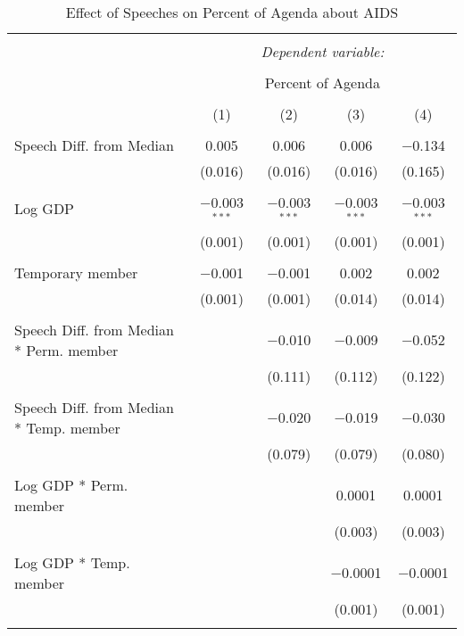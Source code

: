 
\begin{table}[!htbp] \centering 
  \caption{Effect of Speeches on Percent of Agenda about  AIDS} 
  \label{} 
\begin{tabular}{@{\extracolsep{5pt}}lcccc} 
\\[-1.8ex]\hline 
\hline \\[-1.8ex] 
 & \multicolumn{4}{c}{\textit{Dependent variable:}} \\ 
\cline{2-5} 
\\[-1.8ex] & \multicolumn{4}{c}{Percent of Agenda} \\ 
\\[-1.8ex] & (1) & (2) & (3) & (4)\\ 
\hline \\[-1.8ex] 
 Speech Diff. from Median & 0.005 & 0.006 & 0.006 & $-$0.134 \\ 
  & (0.016) & (0.016) & (0.016) & (0.165) \\ 
  & & & & \\ 
 Log GDP & $-$0.003$^{***}$ & $-$0.003$^{***}$ & $-$0.003$^{***}$ & $-$0.003$^{***}$ \\ 
  & (0.001) & (0.001) & (0.001) & (0.001) \\ 
  & & & & \\ 
 Temporary member & $-$0.001 & $-$0.001 & 0.002 & 0.002 \\ 
  & (0.001) & (0.001) & (0.014) & (0.014) \\ 
  & & & & \\ 
 Speech Diff. from Median * Perm. member &  & $-$0.010 & $-$0.009 & $-$0.052 \\ 
  &  & (0.111) & (0.112) & (0.122) \\ 
  & & & & \\ 
 Speech Diff. from Median * Temp. member &  & $-$0.020 & $-$0.019 & $-$0.030 \\ 
  &  & (0.079) & (0.079) & (0.080) \\ 
  & & & & \\ 
 Log GDP * Perm. member &  &  & 0.0001 & 0.0001 \\ 
  &  &  & (0.003) & (0.003) \\ 
  & & & & \\ 
 Log GDP * Temp. member &  &  & $-$0.0001 & $-$0.0001 \\ 
  &  &  & (0.001) & (0.001) \\ 
  & & & & \\ 

\end{tabular}
\end{table}
